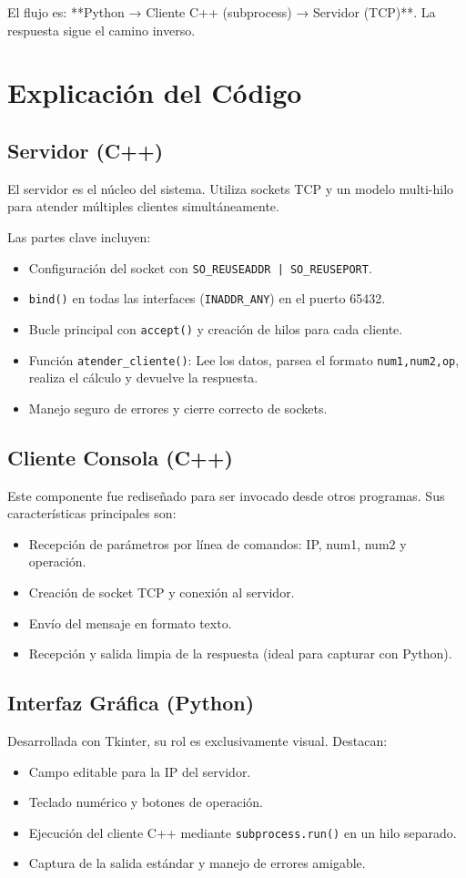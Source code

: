 \documentclass[12pt,a4paper]{article}
\begin{document}
El flujo es: **Python → Cliente C++ (subprocess) → Servidor (TCP)**. La respuesta sigue el camino inverso.

\section{Explicación del Código}

\subsection{Servidor (C++)}
El servidor es el núcleo del sistema. Utiliza sockets TCP y un modelo multi-hilo para atender múltiples clientes simultáneamente.

Las partes clave incluyen:
\begin{itemize}
    \item Configuración del socket con \texttt{SO\_REUSEADDR | SO\_REUSEPORT}.
    \item \texttt{bind()} en todas las interfaces (\texttt{INADDR\_ANY}) en el puerto 65432.
    \item Bucle principal con \texttt{accept()} y creación de hilos para cada cliente.
    \item Función \texttt{atender\_cliente()}: Lee los datos, parsea el formato \texttt{num1,num2,op}, realiza el cálculo y devuelve la respuesta.
    \item Manejo seguro de errores y cierre correcto de sockets.
\end{itemize}

\subsection{Cliente Consola (C++)}
Este componente fue rediseñado para ser invocado desde otros programas. Sus características principales son:
\begin{itemize}
    \item Recepción de parámetros por línea de comandos: IP, num1, num2 y operación.
    \item Creación de socket TCP y conexión al servidor.
    \item Envío del mensaje en formato texto.
    \item Recepción y salida limpia de la respuesta (ideal para capturar con Python).
\end{itemize}

\subsection{Interfaz Gráfica (Python)}
Desarrollada con Tkinter, su rol es exclusivamente visual. Destacan:
\begin{itemize}
    \item Campo editable para la IP del servidor.
    \item Teclado numérico y botones de operación.
    \item Ejecución del cliente C++ mediante \texttt{subprocess.run()} en un hilo separado.
    \item Captura de la salida estándar y manejo de errores amigable.
\end{itemize}
\end{document}
